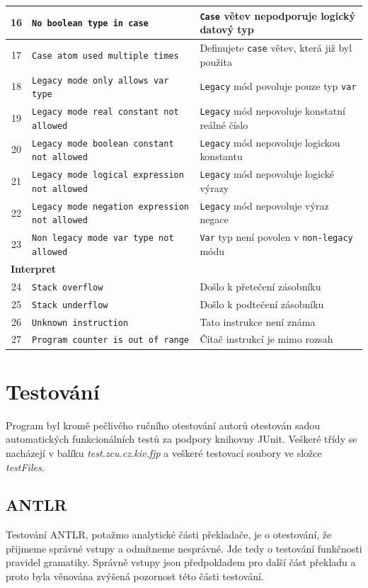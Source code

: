 \documentclass[
12pt,
a4paper,
pdftex,
czech,
titlepage
]{report}
\begin{document}
\begin{longtable}{|c|p{5.5cm}|p{6.5cm}|}
\rule{0pt}{3ex}16 & \texttt{No boolean type in case} & \texttt{Case} větev nepodporuje logický datový typ \\ \hline
\rule{0pt}{3ex}17 & \texttt{Case atom used multiple times} & Definujete \texttt{case} větev, která již byl použita \\ \hline
\rule{0pt}{3ex}18 & \texttt{Legacy mode only allows var type} & \texttt{Legacy} mód povoluje pouze typ \texttt{var} \\ \hline
\rule{0pt}{3ex}19 & \texttt{Legacy mode real constant not allowed} & \texttt{Legacy} mód nepovoluje konstatní reálné číslo \\ \hline
\rule{0pt}{3ex}20 & \texttt{Legacy mode boolean constant not allowed} & \texttt{Legacy} mód nepovoluje logickou konstantu \\ \hline
\rule{0pt}{3ex}21 & \texttt{Legacy mode logical expression not allowed} & \texttt{Legacy} mód nepovoluje logické výrazy \\ \hline
\rule{0pt}{3ex}22 & \texttt{Legacy mode negation expression not allowed} & \texttt{Legacy} mód nepovoluje výraz negace \\ \hline
\rule{0pt}{3ex}23 & \texttt{Non legacy mode var type not allowed} & \texttt{Var} typ není povolen v \texttt{non-legacy} módu \\ \hline
\multicolumn{3}{|l|}{\textbf{Interpret}}\\ \hline
\rule{0pt}{3ex}24 & \texttt{Stack overflow} & Došlo k přetečení zásobníku \\ \hline
\rule{0pt}{3ex}25 & \texttt{Stack underflow} & Došlo k podtečení zásobníku \\ \hline
\rule{0pt}{3ex}26 & \texttt{Unknown instruction} & Tato instrukce není známa \\ \hline
\rule{0pt}{3ex}27 & \texttt{Program counter is out of range} & Čítač instrukcí je mimo rozsah \\ \hline
\end{longtable}

\chapter{Testování}

Program byl kromě pečlivého ručního otestování autorů otestován sadou automatických funkcionálních testů za podpory knihovny JUnit. Veškeré třídy se nacházejí v balíku \textit{test.zcu.cz.kiv.fjp} a veškeré testovací soubory ve složce \textit{testFiles}.

\section{ANTLR}
Testování ANTLR, potažmo analytické části překladače, je o otestování, že přijmeme správné vstupy a odmítneme nesprávné. Jde tedy o testování funkčnosti pravidel gramatiky. Správně vstupy jsou předpokladem pro další část překladu a proto byla věnována zvýšená pozornost této části testování. 
\end{document}
